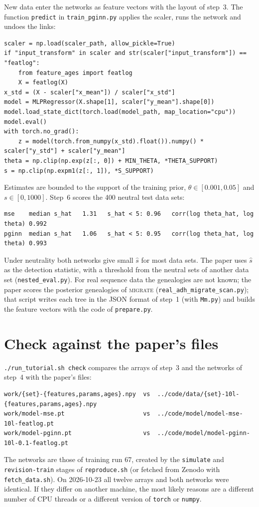 \documentclass[11pt]{article}
\newcommand{\file}[1]{\texttt{#1}}
\newcommand{\migrate}{\textsc{migrate}\xspace}
\begin{document}
New data enter the networks as feature vectors with the layout of
step~3. The function \texttt{predict} in \file{train\_pginn.py} applies
the scaler, runs the network and undoes the links:
\begin{lstlisting}[style=py, title={\file{../code/train\_pginn.py}, \texttt{predict} (core lines)}]
scaler = np.load(scaler_path, allow_pickle=True)
if "input_transform" in scaler and str(scaler["input_transform"]) == "featlog":
    from feature_ages import featlog
    X = featlog(X)
x_std = (X - scaler["x_mean"]) / scaler["x_std"]
model = MLPRegressor(X.shape[1], scaler["y_mean"].shape[0])
model.load_state_dict(torch.load(model_path, map_location="cpu"))
model.eval()
with torch.no_grad():
    z = model(torch.from_numpy(x_std).float()).numpy() * scaler["y_std"] + scaler["y_mean"]
theta = np.clip(np.exp(z[:, 0]) + MIN_THETA, *THETA_SUPPORT)
s = np.clip(np.expm1(z[:, 1]), *S_SUPPORT)
\end{lstlisting}
Estimates are bounded to the support of the training prior,
$\theta\in[0.001,0.05]$ and $s\in[0,1000]$.
Step~6 scores the 400 neutral test data sets:
\begin{lstlisting}
mse    median s_hat   1.31   s_hat < 5: 0.96   corr(log theta_hat, log theta) 0.992
pginn  median s_hat   1.06   s_hat < 5: 0.95   corr(log theta_hat, log theta) 0.993
\end{lstlisting}
Under neutrality both networks give small $\hat s$ for most data sets.
The paper uses $\hat s$ as the detection statistic, with a threshold
from the neutral sets of another data set (\file{nested\_eval.py}).
For real sequence data the genealogies are not known; the paper scores
the posterior genealogies of \migrate
(\file{real\_adh\_migrate\_scan.py}); that script writes each tree in
the JSON format of step~1 (with \file{Mm.py}) and builds the feature
vectors with the code of \file{prepare.py}.

\section{Check against the paper's files}\label{sec:check}

\file{./run\_tutorial.sh check} compares the arrays of step~3 and the
networks of step~4 with the paper's files:
\begin{lstlisting}
work/{set}-{features,params,ages}.npy  vs  ../code/data/{set}-10l-{features,params,ages}.npy
work/model-mse.pt                      vs  ../code/model/model-mse-10l-featlog.pt
work/model-pginn.pt                    vs  ../code/model/model-pginn-10l-0.1-featlog.pt
\end{lstlisting}
The networks are those of training run 67, created by the \texttt{simulate} and
\texttt{revision-train} stages of \file{reproduce.sh} (or fetched from
Zenodo with \file{fetch\_data.sh}).
On 2026-10-23 all twelve arrays and both networks were identical.
If they differ on another machine, the most likely reasons are a
different number of CPU threads or a different version of
\texttt{torch} or \texttt{numpy}.
\end{document}
